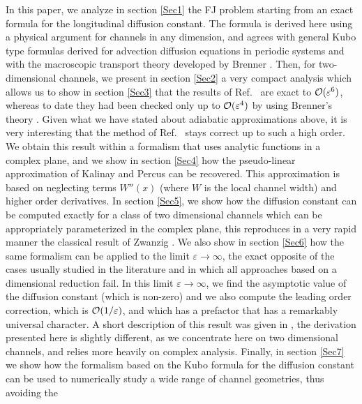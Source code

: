 \documentclass[pre,showpacs,preprintnumbers,amsmath,amssymb,superscriptaddress]{revtex4-1}
\begin{document}



In this paper, we analyze in section \ref{Sec1} the FJ problem starting from an exact formula for the longitudinal diffusion constant. The formula is derived here using a physical argument for channels in any dimension, and agrees with general Kubo type formulas derived for advection diffusion equations in periodic systems \cite{gue2015a,gue2015b} and with the macroscopic transport theory developed by Brenner \cite{bre1993}. Then, for two-dimensional channels, we present in section \ref{Sec2} a very compact analysis which allows us to show in section \ref{Sec3} that the results of Ref.~\cite{kal2006} are exact to ${\cal O}(\varepsilon^6)$, whereas to date they had been checked only up to ${\cal O}(\varepsilon^4)$ by using Brenner's theory \cite{dorfman2014assessing}. Given what we have stated about adiabatic approximations above, it is very interesting that the method of Ref.~\cite{kal2006} stays correct up to such a high order.  We obtain this result within a formalism that uses analytic functions in a complex plane, and we show in section \ref{Sec4} how the pseudo-linear approximation of Kalinay and Percus can be recovered. This approximation is based on neglecting terms $W''(x)$ (where $W$ is the local channel width) and higher order derivatives. In section \ref{Sec5}, we show how the diffusion constant can be computed exactly for a class of two dimensional channels which can be appropriately parameterized in the complex plane, this reproduces in a very rapid manner the classical result of Zwanzig \cite{zwa1982}. We also show in section \ref{Sec6} how the same formalism can be applied to the  limit $\varepsilon \to \infty$, the exact opposite of the cases usually studied in the literature and in which all approaches based on a dimensional reduction fail. In this limit $\varepsilon\to\infty$, we find the asymptotic value of the diffusion constant (which is non-zero) and we also compute the leading order correction, which is ${\cal O}(1/\varepsilon)$, and which has a prefactor that has a remarkably universal character. A short description of this result was given in \cite{man2017}, the derivation presented here is slightly different, as we concentrate here on two dimensional channels, and relies more heavily on complex analysis. Finally, in section \ref{Sec7} we show how the formalism based on the Kubo formula for the diffusion constant can be used to numerically study a wide range of channel geometries, thus avoiding the 
\end{document}
